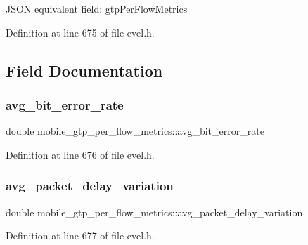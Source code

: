 J\+S\+ON equivalent field\+: gtp\+Per\+Flow\+Metrics 

Definition at line 675 of file evel.\+h.



\subsection{Field Documentation}
\hypertarget{structmobile__gtp__per__flow__metrics_a450a2acbcc4dd919bb36777e1f0395a0}{}\label{structmobile__gtp__per__flow__metrics_a450a2acbcc4dd919bb36777e1f0395a0} 
\subsubsection{\texorpdfstring{avg\+\_\+bit\+\_\+error\+\_\+rate}{avg\_bit\_error\_rate}}
{\footnotesize\ttfamily double mobile\+\_\+gtp\+\_\+per\+\_\+flow\+\_\+metrics\+::avg\+\_\+bit\+\_\+error\+\_\+rate}



Definition at line 676 of file evel.\+h.

\hypertarget{structmobile__gtp__per__flow__metrics_ad619a28eb142fb173499d94a3e292232}{}\label{structmobile__gtp__per__flow__metrics_ad619a28eb142fb173499d94a3e292232} 
\subsubsection{\texorpdfstring{avg\+\_\+packet\+\_\+delay\+\_\+variation}{avg\_packet\_delay\_variation}}
{\footnotesize\ttfamily double mobile\+\_\+gtp\+\_\+per\+\_\+flow\+\_\+metrics\+::avg\+\_\+packet\+\_\+delay\+\_\+variation}



Definition at line 677 of file evel.\+h.

\hypertarget{structmobile__gtp__per__flow__metrics_aa1c0ff4dc2e882e6ab940fa2d8fc5f6a}{}\label{structmobile__gtp__per__flow__metrics_aa1c0ff4dc2e882e6ab940fa2d8fc5f6a} 
